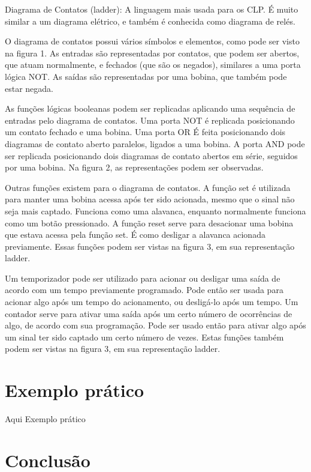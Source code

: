 \documentclass{article}
\begin{document}
Diagrama de Contatos (ladder): A linguagem mais usada para os CLP. É muito similar a um diagrama elétrico, e também é conhecida como diagrama de relés. 

 

O diagrama de contatos possui vários símbolos e elementos, como pode ser visto na figura 1. As entradas são representadas por contatos, que podem ser abertos, que atuam normalmente, e fechados (que são os negados), similares a uma porta lógica NOT. As saídas são representadas por uma bobina, que também pode estar negada.


As funções lógicas booleanas podem ser replicadas aplicando uma sequência de entradas pelo diagrama de contatos. Uma porta NOT é replicada posicionando um contato fechado e uma bobina. Uma porta OR É feita posicionando dois diagramas de contato aberto paralelos, ligados a uma bobina. A porta AND pode ser replicada posicionando dois diagramas de contato abertos em série, seguidos por uma bobina. Na figura 2, as representações podem ser observadas.



Outras funções existem para o diagrama de contatos. A função set é utilizada para manter uma bobina acessa após ter sido acionada, mesmo que o sinal não seja mais captado. Funciona como uma alavanca, enquanto normalmente funciona como um botão pressionado. A função reset serve para desacionar uma bobina que estava acessa pela função set. É como desligar a alavanca acionada previamente. Essas funções podem ser vistas na figura 3, em sua representação ladder.  

Um temporizador pode ser utilizado para acionar ou desligar uma saída de acordo com um tempo previamente programado. Pode então ser usada para acionar algo após um tempo do acionamento, ou desligá-lo após um tempo. Um contador serve para ativar uma saída após um certo número de ocorrências de algo, de acordo com sua programação. Pode ser usado então para ativar algo após um sinal ter sido captado um certo número de vezes. Estas funções também podem ser vistas na figura 3, em sua representação ladder.

\section{Exemplo prático}
Aqui Exemplo prático

\section{Conclusão}
\end{document}
